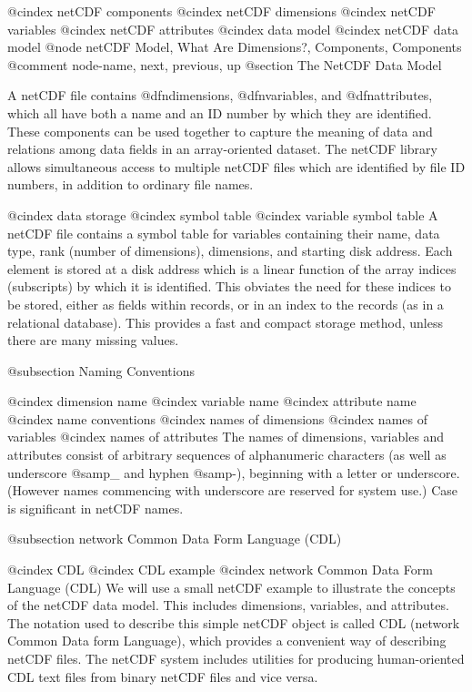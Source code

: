 @cindex netCDF components
@cindex netCDF dimensions
@cindex netCDF variables
@cindex netCDF attributes
@cindex data model
@cindex netCDF data model
@node netCDF Model, What Are Dimensions?, Components, Components
@comment  node-name,  next,  previous,  up
@section The NetCDF Data Model

A netCDF file contains @dfn{dimensions}, @dfn{variables}, and
@dfn{attributes}, which all have both a name and an ID number by
which they are identified.
These components can be used together to capture the
meaning of data and relations among data fields in an array-oriented dataset.
The netCDF library allows simultaneous access to multiple netCDF files
which are identified by file ID numbers, in addition to ordinary file names.

@cindex data storage
@cindex symbol table
@cindex variable symbol table
A netCDF file contains a symbol table for variables containing
their name, data type, rank (number of dimensions), dimensions, and
starting disk address.
Each element is stored at a disk address which is a linear function of the
array indices (subscripts) by which it is identified.
This obviates the need for these indices to be stored, either as fields within
records, or in an index to the records (as in a relational database).
This provides a fast and compact storage method, unless there are many
missing values.

@subsection Naming Conventions

@cindex dimension name
@cindex variable name
@cindex attribute name
@cindex name conventions
@cindex names of dimensions
@cindex names of variables
@cindex names of attributes
The names of dimensions, variables and attributes consist of
arbitrary sequences of alphanumeric characters
(as well as underscore @samp{_} and hyphen
@samp{-}), beginning with a letter or underscore. (However names
commencing with underscore are reserved for system use.)
Case is significant in netCDF names.

@subsection network Common Data Form Language (CDL)

@cindex CDL
@cindex CDL example
@cindex network Common Data Form Language (CDL)
We will use a small netCDF example to illustrate the concepts of the
netCDF data model.
This includes
dimensions, variables, and attributes.  The notation used to describe
this simple netCDF object is called CDL (network Common Data form
Language), which provides a convenient way of describing netCDF files.
The netCDF system includes utilities for producing  human-oriented
CDL text files from binary netCDF files  and vice versa.

